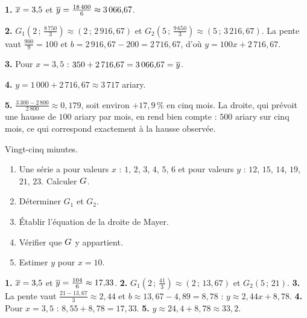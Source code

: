 \begin{corrige}
\textbf{1.} $\overline{x} = 3{,}5$ et
$\overline{y} = \frac{18\,400}{6} \approx 3\,066{,}67$.

\textbf{2.} $G_{1}\left(2\,;\,\frac{8\,750}{3}\right)
\approx (2\,;\,2\,916{,}67)$ et
$G_{2}\left(5\,;\,\frac{9\,650}{3}\right) \approx (5\,;\,3\,216{,}67)$. La
pente vaut $\frac{900}{9} = 100$ et
$b = 2\,916{,}67-200 = 2\,716{,}67$, d'où
$y = 100x+2\,716{,}67$.

\textbf{3.} Pour $x = 3{,}5$ : $350+2\,716{,}67 = 3\,066{,}67 = \overline{y}$.
\checkmark

\textbf{4.} $y = 1\,000+2\,716{,}67 \approx 3\,717$ ariary.

\textbf{5.} $\frac{3\,300-2\,800}{2\,800} \approx 0{,}179$, soit environ
$+17{,}9\,\%$ en cinq mois. La droite, qui prévoit une hausse de $100$
ariary par mois, en rend bien compte : $500$ ariary sur cinq mois, ce qui
correspond exactement à la hausse observée.
\end{corrige}

\begin{jemeteste}
Vingt-cinq minutes.

\begin{enumerate}[label=\textbf{\arabic*.}, leftmargin=*, itemsep=0.3em]
  \item Une série a pour valeurs $x$ : $1$, $2$, $3$, $4$, $5$, $6$ et pour
        valeurs $y$ : $12$, $15$, $14$, $19$, $21$, $23$. Calculer
        $G$.
  \item Déterminer $G_{1}$ et $G_{2}$.
  \item Établir l'équation de la droite de Mayer.
  \item Vérifier que $G$ y appartient.
  \item Estimer $y$ pour $x = 10$.
\end{enumerate}
\end{jemeteste}

\begin{corrige}[je me teste]
\textbf{1.} $\overline{x} = 3{,}5$ et $\overline{y} = \frac{104}{6}
\approx 17{,}33$.
\textbf{2.} $G_{1}\left(2\,;\,\frac{41}{3}\right) \approx (2\,;\,13{,}67)$
et $G_{2}\left(5\,;\,21\right)$.
\textbf{3.} La pente vaut $\frac{21-13{,}67}{3} \approx 2{,}44$ et
$b \approx 13{,}67-4{,}89 = 8{,}78$ : $y \approx 2{,}44x+8{,}78$.
\textbf{4.} Pour $x = 3{,}5$ : $8{,}55+8{,}78 = 17{,}33$. \checkmark
\textbf{5.} $y \approx 24{,}4+8{,}78 \approx 33{,}2$.
\end{corrige}

